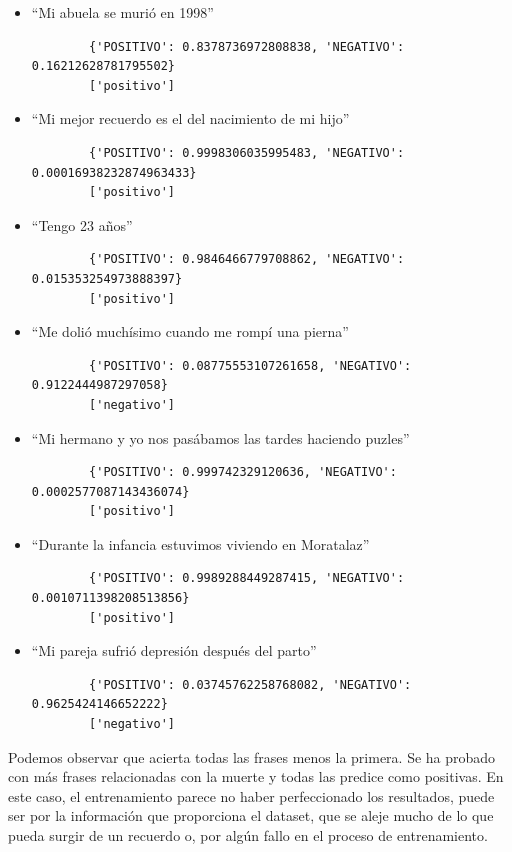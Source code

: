 \begin{itemize}
	\item ``Mi abuela se murió en 1998''
	\begin{verbatim}
		{'POSITIVO': 0.8378736972808838, 'NEGATIVO': 0.16212628781795502}
		['positivo']
	\end{verbatim}
	\item ``Mi mejor recuerdo es el del nacimiento de mi hijo''
	\begin{verbatim}
		{'POSITIVO': 0.9998306035995483, 'NEGATIVO': 0.00016938232874963433}
		['positivo']
	\end{verbatim}
	\item ``Tengo 23 años''
	\begin{verbatim}
		{'POSITIVO': 0.9846466779708862, 'NEGATIVO': 0.015353254973888397}
		['positivo']
	\end{verbatim}
	\item ``Me dolió muchísimo cuando me rompí una pierna''
	\begin{verbatim}
		{'POSITIVO': 0.08775553107261658, 'NEGATIVO': 0.9122444987297058}
		['negativo']
	\end{verbatim}
	\item ``Mi hermano y yo nos pasábamos las tardes haciendo puzles''
	\begin{verbatim}
		{'POSITIVO': 0.999742329120636, 'NEGATIVO': 0.0002577087143436074}
		['positivo']
	\end{verbatim}
	\item ``Durante la infancia estuvimos viviendo en Moratalaz''
	\begin{verbatim}
		{'POSITIVO': 0.9989288449287415, 'NEGATIVO': 0.0010711398208513856}
		['positivo']
	\end{verbatim}
	\item ``Mi pareja sufrió depresión después del parto''
	\begin{verbatim}
		{'POSITIVO': 0.03745762258768082, 'NEGATIVO': 0.9625424146652222}
		['negativo']
	\end{verbatim}
	
\end{itemize}

Podemos observar que acierta todas las frases menos la primera. Se ha probado con más frases relacionadas con la muerte y todas las predice como positivas. En este caso, el entrenamiento parece no haber perfeccionado los resultados, puede ser por la información que proporciona el dataset, que se aleje mucho de lo que pueda surgir de un recuerdo o, por algún fallo en el proceso de entrenamiento.  

